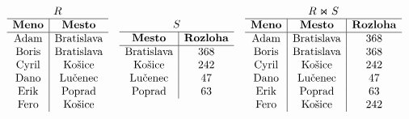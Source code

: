     \begin{priklad}
        \begin{center}
        \[
            \begin{array}{c c c}
                \begin{array}{c|c}
                \multicolumn{2}{c}{R} \\ \hline
                \textbf{Meno} & \textbf{Mesto} \\ \hline
                \text{Adam}   & \text{Bratislava} \\
                \text{Boris}  & \text{Bratislava} \\
                \text{Cyril}  & \text{Košice}     \\
                \text{Dano}   & \text{Lučenec}    \\
                \text{Erik}   & \text{Poprad}     \\
                \text{Fero}   & \text{Košice}     \\
                \end{array}
                &
                \begin{array}{c|c}
                \multicolumn{2}{c}{S} \\ \hline
                \textbf{Mesto}      & \textbf{Rozloha} \\ \hline
                \text{Bratislava}   & \text{368} \\
                \text{Košice}       & \text{242} \\
                \text{Lučenec}      & \text{47}  \\
                \text{Poprad}       & \text{63}  \\
                \end{array}
                &
                \begin{array}{c|c|c}
                \multicolumn{3}{c}{R \Join S} \\ \hline
                \textbf{Meno} & \textbf{Mesto}    & \textbf{Rozloha} \\ \hline
                \text{Adam}   & \text{Bratislava} & \text{368} \\
                \text{Boris}  & \text{Bratislava} & \text{368} \\
                \text{Cyril}  & \text{Košice}     & \text{242} \\
                \text{Dano}   & \text{Lučenec}    & \text{47}  \\
                \text{Erik}   & \text{Poprad}     & \text{63}  \\
                \text{Fero}   & \text{Košice}     & \text{242} \\
                \end{array}
            \end{array}
        \]
        \end{center}
    \end{priklad}
    
